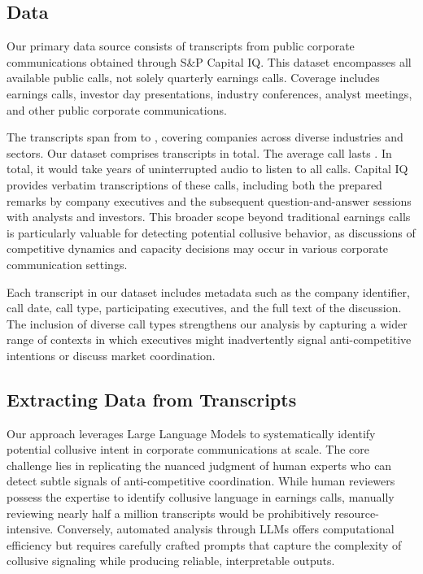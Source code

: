 \subsection{Data}

Our primary data source consists of transcripts from public corporate communications obtained through S\&P Capital IQ. This dataset encompasses all available public calls, not solely quarterly earnings calls. Coverage includes earnings calls, investor day presentations, industry conferences, analyst meetings, and other public corporate communications.

The transcripts span from  to , covering  companies across diverse industries and sectors. Our dataset comprises  transcripts in total. The average call lasts . In total, it would take  years of uninterrupted audio to listen to all calls. Capital IQ provides verbatim transcriptions of these calls, including both the prepared remarks by company executives and the subsequent question-and-answer sessions with analysts and investors. This broader scope beyond traditional earnings calls is particularly valuable for detecting potential collusive behavior, as discussions of competitive dynamics and capacity decisions may occur in various corporate communication settings.

Each transcript in our dataset includes metadata such as the company identifier, call date, call type, participating executives, and the full text of the discussion. The inclusion of diverse call types strengthens our analysis by capturing a wider range of contexts in which executives might inadvertently signal anti-competitive intentions or discuss market coordination.

\subsection{Extracting Data from Transcripts}

Our approach leverages Large Language Models to systematically identify potential collusive intent in corporate communications at scale. The core challenge lies in replicating the nuanced judgment of human experts who can detect subtle signals of anti-competitive coordination. While human reviewers possess the expertise to identify collusive language in earnings calls, manually reviewing nearly half a million transcripts would be prohibitively resource-intensive. Conversely, automated analysis through LLMs offers computational efficiency but requires carefully crafted prompts that capture the complexity of collusive signaling while producing reliable, interpretable outputs.

